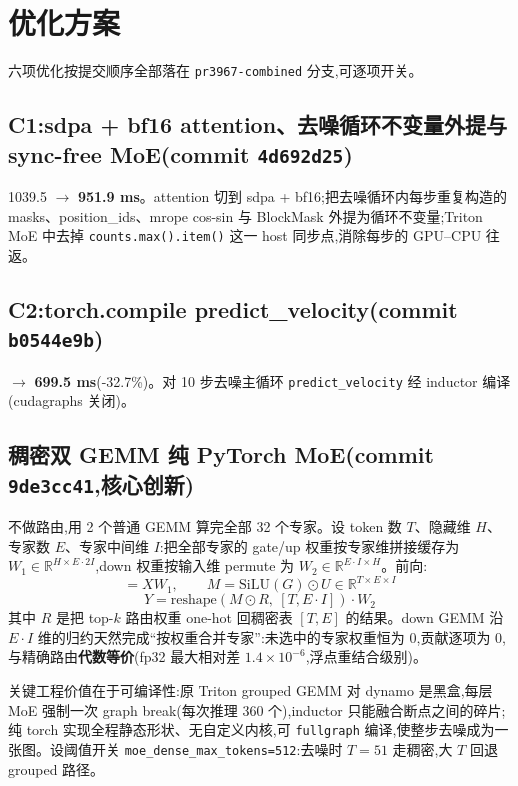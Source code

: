 \documentclass[11pt]{ctexart}
\begin{document}
\section{优化方案}
六项优化按提交顺序全部落在 \texttt{pr3967-combined} 分支,可逐项开关。

\subsection{C1:sdpa + bf16 attention、去噪循环不变量外提与 sync-free MoE(commit \texttt{4d692d25})}
1039.5 $\to$ \textbf{951.9 ms}。attention 切到 sdpa + bf16;把去噪循环内每步重复构造的 masks、position\_ids、mrope cos-sin 与 BlockMask 外提为循环不变量;Triton MoE 中去掉 \texttt{counts.max().item()} 这一 host 同步点,消除每步的 GPU--CPU 往返。

\subsection{C2:torch.compile predict\_velocity(commit \texttt{b0544e9b})}
$\to$ \textbf{699.5 ms}(-32.7\%)。对 10 步去噪主循环 \texttt{predict\_velocity} 经 inductor 编译(cudagraphs 关闭)。

\subsection{稠密双 GEMM 纯 PyTorch MoE(commit \texttt{9de3cc41},核心创新)}
不做路由,用 2 个普通 GEMM 算完全部 32 个专家。设 token 数 $T$、隐藏维 $H$、专家数 $E$、专家中间维 $I$:把全部专家的 gate/up 权重按专家维拼接缓存为 $W_1 \in \mathbb{R}^{H \times E\cdot 2I}$,down 权重按输入维 permute 为 $W_2 \in \mathbb{R}^{E\cdot I \times H}$。前向:
\begin{equation}
[\,G \,\|\, U\,] = X W_1, \qquad M = \mathrm{SiLU}(G)\odot U \in \mathbb{R}^{T\times E\times I}
\end{equation}
\begin{equation}
Y = \mathrm{reshape}(M \odot R,\ [T, E\cdot I]) \cdot W_2
\end{equation}
其中 $R$ 是把 top-$k$ 路由权重 one-hot 回稠密表 $[T, E]$ 的结果。down GEMM 沿 $E\cdot I$ 维的归约天然完成``按权重合并专家'':未选中的专家权重恒为 0,贡献逐项为 0,与精确路由\textbf{代数等价}(fp32 最大相对差 $1.4\times10^{-6}$,浮点重结合级别)。

关键工程价值在于可编译性:原 Triton grouped GEMM 对 dynamo 是黑盒,每层 MoE 强制一次 graph break(每次推理 360 个),inductor 只能融合断点之间的碎片;纯 torch 实现全程静态形状、无自定义内核,可 \texttt{fullgraph} 编译,使整步去噪成为一张图。设阈值开关 \texttt{moe\_dense\_max\_tokens=512}:去噪时 $T{=}51$ 走稠密,大 $T$ 回退 grouped 路径。
\end{document}
